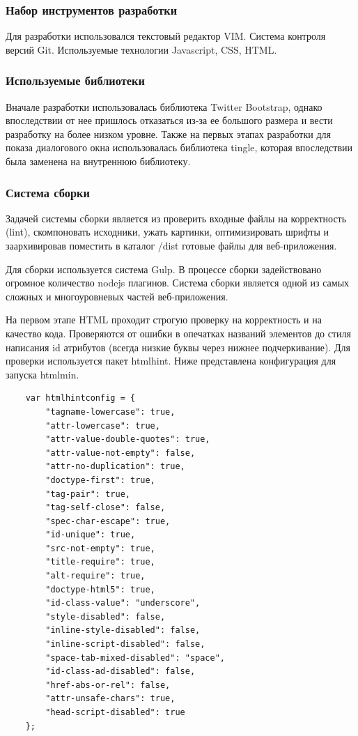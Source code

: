 \subsubsection{Набор инструментов разработки}
Для разработки использовался текстовый редактор VIM. Система контроля версий Git. Используемые технологии Javascript, CSS, HTML.

\subsubsection{Используемые библиотеки}
Вначале разработки использовалась библиотека Twitter Bootstrap, однако впоследствии от нее пришлось отказаться из-за ее большого размера и вести разработку на более низком уровне.
Также на первых этапах разработки для показа диалогового окна использовалась библиотека tingle, которая впоследствии была заменена на внутреннюю библиотеку.

\subsubsection{Система сборки}
Задачей системы сборки является из проверить входные файлы на корректность (lint), скомпоновать исходники, ужать картинки, оптимизировать шрифты и заархивировав поместить в каталог /dist готовые файлы для веб-приложения.

Для сборки используется система Gulp. В процессе сборки задействовано огромное количество nodejs плагинов. 
Система сборки является одной из самых сложных и многоуровневых частей веб-приложения. 

На первом этапе HTML проходит строгую проверку на корректность и на качество кода. Проверяются от ошибки в опечатках названий элементов до стиля написания id атрибутов (всегда низкие буквы через нижнее подчеркивание). Для проверки используется пакет htmlhint. 
Ниже представлена конфигурация для запуска htmlmin.

\begin{small}
\begin{verbatim}
    var htmlhintconfig = {
        "tagname-lowercase": true,
        "attr-lowercase": true,
        "attr-value-double-quotes": true,
        "attr-value-not-empty": false,
        "attr-no-duplication": true,
        "doctype-first": true,
        "tag-pair": true,
        "tag-self-close": false,
        "spec-char-escape": true,
        "id-unique": true,
        "src-not-empty": true,
        "title-require": true,
        "alt-require": true,
        "doctype-html5": true,
        "id-class-value": "underscore",
        "style-disabled": false,
        "inline-style-disabled": false,
        "inline-script-disabled": false,
        "space-tab-mixed-disabled": "space",
        "id-class-ad-disabled": false,
        "href-abs-or-rel": false,
        "attr-unsafe-chars": true,
        "head-script-disabled": true
    };
\end{verbatim}
\end{small}



